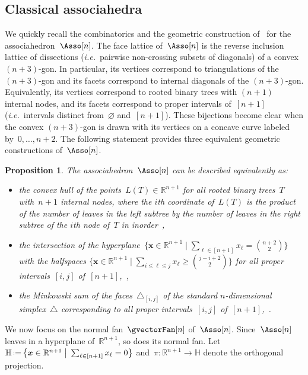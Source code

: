 \documentclass{amsart}
\newtheorem{proposition}[theorem]{Proposition}
\theoremstyle{definition}
\newcommand{\R}{\mathbb{R}} %
\newcommand{\HH}{\mathbb{H}} %
\renewcommand{\b}[1]{{\boldsymbol{#1}}} %
\newcommand{\bigset}[2]{\big\{ #1 \;\big|\; #2 \big\}} %
\newcommand{\eqdef}{\mbox{\,\raisebox{0.2ex}{\scriptsize\ensuremath{\mathrm:}}\ensuremath{=}\,}} %
\newcommand{\simplex}{\triangle} %
\newcommand{\ie}{\textit{i.e.}~} %
\begin{document}

\subsection{Classical associahedra}

We quickly recall the combinatorics and the geometric construction of~\cite{ShniderSternberg, Loday} for the associahedron~$\Asso[n]$.
The face lattice of~$\Asso[n]$ is the reverse inclusion lattice of dissections (\ie pairwise non-crossing subsets of diagonals) of a convex~$(n+3)$-gon.
In particular, its vertices correspond to triangulations of the $(n+3)$-gon and its facets correspond to internal diagonals of the $(n+3)$-gon.
Equivalently, its vertices correspond to rooted binary trees with $(n+1)$ internal nodes, and its facets correspond to proper intervals of~$[n+1]$ (\ie intervals distinct from~$\varnothing$ and~$[n+1]$).
These bijections become clear when the convex $(n+3)$-gon is drawn with its vertices on a concave curve labeled by~$0, \dots, n+2$.
The following statement provides three equivalent geometric constructions of~$\Asso[n]$.

\begin{proposition}
\label{prop:associahedronLoday}
The associahedron~$\Asso[n]$ can be described equivalently as:
\begin{itemize}
\item the convex hull of the points~$L(T) \in \R^{n+1}$ for all rooted binary trees~$T$ with~$n+1$ internal nodes, where the $i$th coordinate of~$L(T)$ is the product of the number of leaves in the left subtree by the number of leaves in the right subtree of the $i$th node of~$T$ in inorder~\cite{Loday},
\item the intersection of the hyperplane~$\bigset{\b{x} \in \R^{n+1}}{\sum_{\ell \in [n+1]} x_\ell = \binom{n+2}{2}}$ with the halfspaces $\bigset{\b{x} \in \R^{n+1}}{\sum_{i \le \ell \le j} x_\ell \ge \binom{j-i+2}{2}}$ for all proper intervals~$[i,j]$ of~$[n+1]$,~\cite{ShniderSternberg},
\item the Minkowski sum of the faces~$\simplex_{[i,j]}$ of the standard $n$-dimensional simplex~$\simplex$ corresponding to all proper intervals~$[i,j]$ of~$[n+1]$,~\cite{Postnikov}.
\end{itemize}
\end{proposition}

We now focus on the normal fan~$\gvectorFan[n]$ of~$\Asso[n]$.
Since~$\Asso[n]$ leaves in a hyperplane of~$\R^{n+1}$, so does its normal fan.
Let~$\HH \eqdef \bigset{\b{x} \in \R^{n+1}}{\sum_{\ell \in [n+1]} x_\ell = 0}$ and~$\pi : \R^{n+1} \to \HH$ denote the orthogonal projection.
\end{document}
